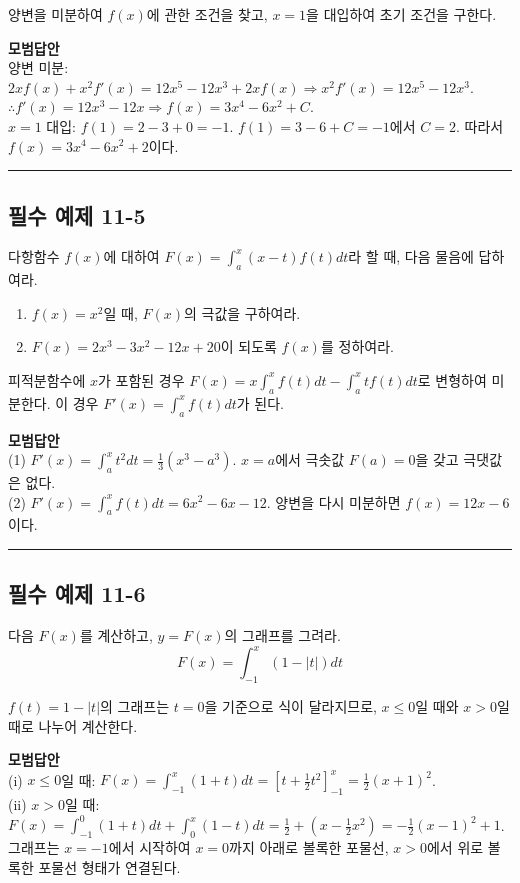 \documentclass[a4paper,11pt]{article}
\begin{document}
\begin{studybox}
양변을 미분하여 $f(x)$에 관한 조건을 찾고, $x=1$을 대입하여 초기 조건을 구한다.
\end{studybox}

\textbf{모범답안}\\
양변 미분: $2xf(x) + x^{2}f'(x) = 12x^{5} - 12x^{3} + 2xf(x) \Rightarrow x^{2}f'(x) = 12x^{5} - 12x^{3}$.
$\therefore f'(x) = 12x^{3} - 12x \Rightarrow f(x) = 3x^{4} - 6x^{2} + C$.\\
$x=1$ 대입: $f(1) = 2 - 3 + 0 = -1$. $f(1) = 3 - 6 + C = -1$에서 $C = 2$.
따라서 $f(x) = 3x^{4} - 6x^{2} + 2$이다.

\vspace{0.5cm}
\hrule
\vspace{0.5cm}

\subsection*{필수 예제 11-5}
다항함수 $f(x)$에 대하여 $F(x) = \int_{a}^{x} (x-t)f(t) dt$라 할 때, 다음 물음에 답하여라. 
\begin{enumerate}
    \item $f(x) = x^{2}$일 때, $F(x)$의 극값을 구하여라. 
    \item $F(x) = 2x^{3} - 3x^{2} - 12x + 20$이 되도록 $f(x)$를 정하여라. 
\end{enumerate}

\begin{studybox}
피적분함수에 $x$가 포함된 경우 $F(x) = x \int_{a}^{x} f(t) dt - \int_{a}^{x} tf(t) dt$로 변형하여 미분한다. 이 경우 $F'(x) = \int_{a}^{x} f(t) dt$가 된다. 
\end{studybox}

\textbf{모범답안} \\
(1) $F'(x) = \int_{a}^{x} t^{2} dt = \frac{1}{3}(x^{3}-a^{3})$. $x=a$에서 극솟값 $F(a)=0$을 갖고 극댓값은 없다.\\
(2) $F'(x) = \int_{a}^{x} f(t) dt = 6x^{2} - 6x - 12$. 양변을 다시 미분하면 $f(x) = 12x - 6$이다.

\vspace{0.5cm}
\hrule
\vspace{0.5cm}

\subsection*{필수 예제 11-6}
다음 $F(x)$를 계산하고, $y=F(x)$의 그래프를 그려라. 
\[ F(x) = \int_{-1}^{x} (1-|t|) dt \]

\begin{studybox} 
$f(t) = 1-|t|$의 그래프는 $t=0$을 기준으로 식이 달라지므로, $x \le 0$일 때와 $x > 0$일 때로 나누어 계산한다.
\end{studybox}

\textbf{모범답안} \\
(i) $x \le 0$일 때: $F(x) = \int_{-1}^{x} (1+t) dt = [t + \frac{1}{2}t^{2}]_{-1}^{x} = \frac{1}{2}(x+1)^{2}$.\\
(ii) $x > 0$일 때: $F(x) = \int_{-1}^{0} (1+t) dt + \int_{0}^{x} (1-t) dt = \frac{1}{2} + (x - \frac{1}{2}x^{2}) = -\frac{1}{2}(x-1)^{2} + 1$.
그래프는 $x=-1$에서 시작하여 $x=0$까지 아래로 볼록한 포물선, $x>0$에서 위로 볼록한 포물선 형태가 연결된다. 
\end{document}
